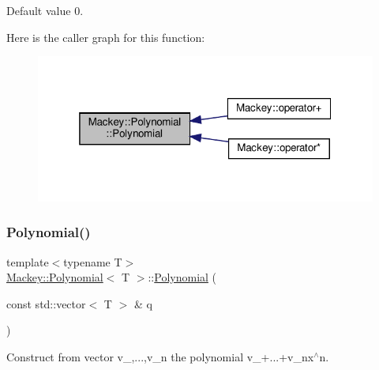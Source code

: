Default value 0. 

Here is the caller graph for this function\+:\nopagebreak
\begin{figure}[H]
\begin{center}
\leavevmode
\includegraphics[width=319pt]{classMackey_1_1Polynomial_a0e0bda8d8d0d5ade1cbb0b0cc79b8d56_icgraph}
\end{center}
\end{figure}
\mbox{\label{classMackey_1_1Polynomial_ad14fdd66f2d9942af17e38fe8c6bb2c9}} 
\subsubsection{\texorpdfstring{Polynomial()}{Polynomial()}\hspace{0.1cm}{\footnotesize\ttfamily [2/4]}}
{\footnotesize\ttfamily template$<$typename T$>$ \\
\hyperlink{classMackey_1_1Polynomial}{Mackey\+::\+Polynomial}$<$ T $>$\+::\hyperlink{classMackey_1_1Polynomial}{Polynomial} (\begin{DoxyParamCaption}\item[{const std\+::vector$<$ T $>$ \&}]{q }\end{DoxyParamCaption})\hspace{0.3cm}{\ttfamily [inline]}}



Construct from vector v\+\_,...,v\+\_\+n the polynomial v\+\_+...+v\+\_\+nx$^\wedge$n. 

\mbox{\label{classMackey_1_1Polynomial_a61522f056a2334c51186f7ed0b35229f}} 
